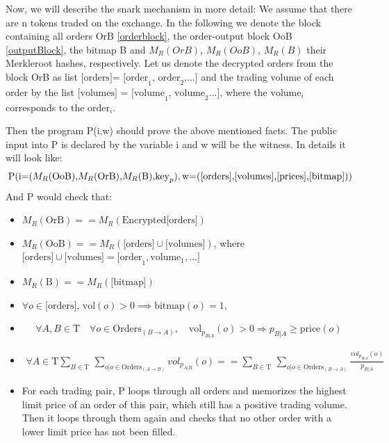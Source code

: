 \documentclass[11pt,parskip=full]{scrartcl}%
\newcommand{\Tau}{\mathrm{T}}
\begin{document}
Now, we will describe the snark mechanism in more detail: We assume that there are n tokens traded on the exchange. In the following we denote the block containing all orders OrB \ref{orderblock}, the order-output block OoB \ref{outputBlock}, the bitmap B and $M_R(OrB)$, $M_R(OoB)$, $M_R(B)$ their Merkleroot hashes, respectively. Let us denote the decrypted orders from the block OrB as list $\text{[orders]= [order}_1\text{, order}_2\text{,...]}$ and the trading volume of each order by the list $\text{[volumes] = [volume}_1\text{, volume}_2\text{...]}$, where the $\text{volume}_i$ corresponds to the $\text{order}_i$.

Then the program P(i,w) should prove the above mentioned facts. The public input into P is declared by the variable i and w will be the witness. In details it will look like:
\begin{equation}
\text{P(i=(}M_R\text{(OoB),}M_R\text{(OrB),}M_R\text{(B),} \text{key}_p),\\
\text{w=([orders],[volumes],[prices],[bitmap]))} 
\end{equation}
And P would check that:
\begin{itemize}
\item  $M_R(\text{OrB}) == M_R(\text{Encrypted[orders]})$
\item  $M_R(\text{OoB}) == M_R(\text{[orders]} \cup \text{[volumes]})$,\newline
where $\text{[orders]} \cup \text{[volumes]} = \text{[order}_1, \text{volume}_1, ...] $
\item $ M_R(\text{B}) == M_R(\text{[bitmap]})$
\item $\forall o \in \text{[orders], vol}(o)>0 \implies \text{bitmap}(o) = 1 $, 

\item 
\begin{equation} \forall A,B \in \Tau  \quad \forall o \in \text{Orders}_{(B\rightarrow A)}, \quad \text{vol}_{p_{B|A}}(o)>0 \Rightarrow p_{B|A}\geq \text{price}(o)
\end{equation}
\item 
\begin{equation}
\begin{split}
\forall A \in \Tau \sum_{B\in \Tau} \,
\sum_{o| o\in \text{Orders}_{(A\rightarrow B)}} vol_{p_{A|B}}(o) == \sum_{B\in \Tau} \, \sum_{o| o\in \text{Orders}_{(B\rightarrow A)}} \frac{vol_{p_{B|A}}(o)}{p_{B|A}}
\end{split}
\end{equation}

\item For each trading pair, P loops through all orders and memorizes the highest limit price of an order of this pair, which still has a positive trading volume. Then it loops through them again and checks that no other order with a lower limit price has not been filled.
\end{itemize}
\end{document}
